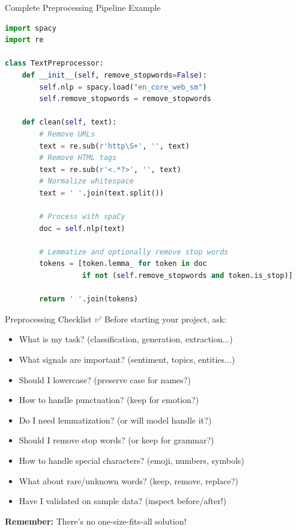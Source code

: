 \documentclass[aspectratio=169]{beamer}
\begin{document}
\begin{frame}[fragile]{Complete Preprocessing Pipeline Example 🔧}
    \begin{lstlisting}[language=Python]
import spacy
import re

class TextPreprocessor:
    def __init__(self, remove_stopwords=False):
        self.nlp = spacy.load("en_core_web_sm")
        self.remove_stopwords = remove_stopwords

    def clean(self, text):
        # Remove URLs
        text = re.sub(r'http\S+', '', text)
        # Remove HTML tags
        text = re.sub(r'<.*?>', '', text)
        # Normalize whitespace
        text = ' '.join(text.split())

        # Process with spaCy
        doc = self.nlp(text)

        # Lemmatize and optionally remove stop words
        tokens = [token.lemma_ for token in doc
                  if not (self.remove_stopwords and token.is_stop)]

        return ' '.join(tokens)
    \end{lstlisting}
\end{frame}

\begin{frame}[shrink=10]{Preprocessing Checklist ✅}
    Before starting your project, ask:

    \begin{itemize}\setlength{\itemsep}{0pt}
        \item[$\square$] What is my task? (classification, generation, extraction...)
        \item[$\square$] What signals are important? (sentiment, topics, entities...)
        \item[$\square$] Should I lowercase? (preserve case for names?)
        \item[$\square$] How to handle punctuation? (keep for emotion?)
        \item[$\square$] Do I need lemmatization? (or will model handle it?)
        \item[$\square$] Should I remove stop words? (or keep for grammar?)
        \item[$\square$] How to handle special characters? (emoji, numbers, symbols)
        \item[$\square$] What about rare/unknown words? (keep, remove, replace?)
        \item[$\square$] Have I validated on sample data? (inspect before/after!)
    \end{itemize}

    \vspace{0.5em}
    \textbf{Remember:} There's no one-size-fits-all solution! 🎯
\end{frame}
\end{document}
